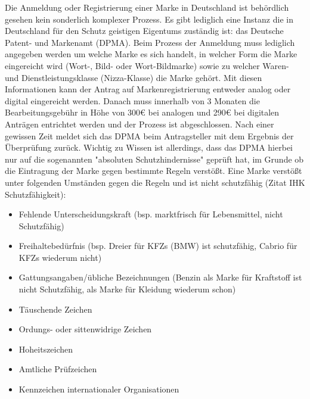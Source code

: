 Die Anmeldung oder Registrierung einer Marke in Deutschland ist behördlich gesehen kein sonderlich komplexer Prozess. Es gibt lediglich eine Instanz die in Deutschland für den Schutz geistigen Eigentums zuständig ist: das Deutsche Patent- und Markenamt (DPMA). Beim Prozess der Anmeldung muss lediglich angegeben werden um welche Marke es sich handelt, in welcher Form die Marke eingereicht wird (Wort-, Bild- oder Wort-Bildmarke) sowie zu welcher Waren- und Dienstleistungsklasse (Nizza-Klasse) die Marke gehört. Mit diesen Informationen kann der Antrag auf Markenregistrierung entweder analog oder digital eingereicht werden. Danach muss innerhalb von 3 Monaten die Bearbeitungsgebühr in Höhe von 300€ bei analogen und 290€ bei digitalen Anträgen entrichtet werden und der Prozess ist abgeschlossen. Nach einer gewissen Zeit meldet sich das DPMA beim Antragsteller mit dem Ergebnis der Überprüfung zurück. Wichtig zu Wissen ist allerdings, dass das DPMA hierbei nur auf die sogenannten "absoluten Schutzhindernisse" geprüft hat, im Grunde ob die Eintragung der Marke gegen bestimmte Regeln verstößt. Eine Marke verstößt unter folgenden Umständen gegen die Regeln und ist nicht schutzfähig (Zitat IHK Schutzfähigkeit):

\begin{itemize}
    \item Fehlende Unterscheidungskraft (bsp. marktfrisch für Lebensmittel, nicht Schutzfähig)
    \item Freihaltebedürfnis (bsp. Dreier für KFZs (BMW) ist schutzfähig, Cabrio für KFZs wiederum nicht)
    \item Gattungsangaben/übliche Bezeichnungen (Benzin als Marke für Kraftstoff ist nicht Schutzfähig, als Marke für Kleidung wiederum schon)
    \item Täuschende Zeichen
    \item Ordungs- oder sittenwidrige Zeichen
    \item Hoheitszeichen
    \item Amtliche Prüfzeichen
    \item Kennzeichen internationaler Organisationen
\end{itemize}

